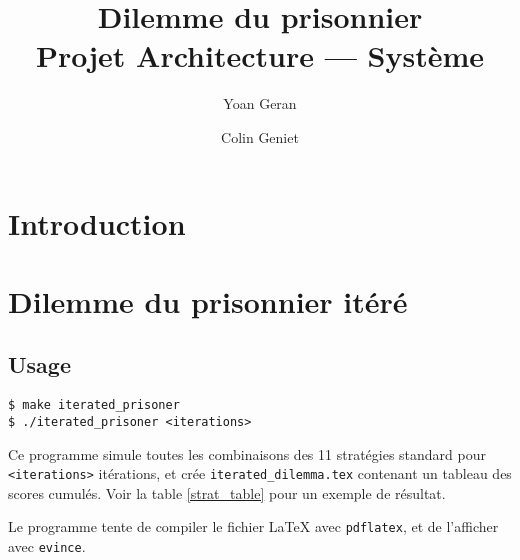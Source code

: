 \documentclass[10pt]{article}
\title{Dilemme du prisonnier \\ Projet Architecture --- Système}
\author{Yoan Geran \and Colin Geniet}
\begin{document}
\maketitle
\tableofcontents

\section*{Introduction}

\section{Dilemme du prisonnier itéré}
\subsection{Usage}
\begin{verbatim}
$ make iterated_prisoner
$ ./iterated_prisoner <iterations>
\end{verbatim}

Ce programme simule toutes les combinaisons des 11 stratégies standard pour \verb|<iterations>| itérations,
et crée \verb|iterated_dilemma.tex| contenant un tableau des scores cumulés.
Voir la table \ref{strat_table} pour un exemple de résultat.

Le programme tente de compiler le fichier \LaTeX{} avec \verb|pdflatex|, et de l'afficher avec \verb|evince|.
\end{document}
